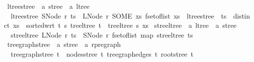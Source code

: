 \begin{isabellebody}
\isanewline
{}\isamarkupfalse%
\ ltree{\isacharunderscore}{\kern0pt}stree\ {\isacharcolon}{\kern0pt}{\isacharcolon}{\kern0pt}\ {\isachardoublequoteopen}{\isacharprime}{\kern0pt}a\ stree\ {\isasymRightarrow}\ {\isacharprime}{\kern0pt}a\ ltree{\isachardoublequoteclose}\ \isanewline
\ \ {\isachardoublequoteopen}ltree{\isacharunderscore}{\kern0pt}stree\ {\isacharparenleft}{\kern0pt}SNode\ r\ ts{\isacharparenright}{\kern0pt}\ {\isacharequal}{\kern0pt}\ LNode\ r\ {\isacharparenleft}{\kern0pt}SOME\ xs{\isachardot}{\kern0pt}\ fset{\isacharunderscore}{\kern0pt}of{\isacharunderscore}{\kern0pt}list\ xs\ {\isacharequal}{\kern0pt}\ ltree{\isacharunderscore}{\kern0pt}stree\ {\isacharbar}{\kern0pt}{\isacharbackquote}{\kern0pt}{\isacharbar}{\kern0pt}\ ts\ {\isasymand}\ distinct\ xs\ {\isasymand}\ sorted{\isacharunderscore}{\kern0pt}wrt\ {\isacharparenleft}{\kern0pt}{\isasymlambda}t\ s{\isachardot}{\kern0pt}\ tree{\isacharunderscore}{\kern0pt}ltree\ t\ {\isasymle}\ tree{\isacharunderscore}{\kern0pt}ltree\ s{\isacharparenright}{\kern0pt}\ xs{\isacharparenright}{\kern0pt}{\isachardoublequoteclose}\isanewline
\isanewline
{}\isamarkupfalse%
\ stree{\isacharunderscore}{\kern0pt}ltree\ {\isacharcolon}{\kern0pt}{\isacharcolon}{\kern0pt}\ {\isachardoublequoteopen}{\isacharprime}{\kern0pt}a\ ltree\ {\isasymRightarrow}\ {\isacharprime}{\kern0pt}a\ stree{\isachardoublequoteclose}\ \isanewline
\ \ {\isachardoublequoteopen}stree{\isacharunderscore}{\kern0pt}ltree\ {\isacharparenleft}{\kern0pt}LNode\ r\ ts{\isacharparenright}{\kern0pt}\ {\isacharequal}{\kern0pt}\ SNode\ r\ {\isacharparenleft}{\kern0pt}fset{\isacharunderscore}{\kern0pt}of{\isacharunderscore}{\kern0pt}list\ {\isacharparenleft}{\kern0pt}map\ stree{\isacharunderscore}{\kern0pt}ltree\ ts{\isacharparenright}{\kern0pt}{\isacharparenright}{\kern0pt}{\isachardoublequoteclose}\isanewline
\isanewline
{}\isamarkupfalse%
\ tree{\isacharunderscore}{\kern0pt}graph{\isacharunderscore}{\kern0pt}stree\ {\isacharcolon}{\kern0pt}{\isacharcolon}{\kern0pt}\ {\isachardoublequoteopen}{\isacharprime}{\kern0pt}a\ stree\ {\isasymRightarrow}\ {\isacharprime}{\kern0pt}a\ rpregraph{\isachardoublequoteclose}\ \isanewline
\ \ {\isachardoublequoteopen}tree{\isacharunderscore}{\kern0pt}graph{\isacharunderscore}{\kern0pt}stree\ t\ {\isacharequal}{\kern0pt}\ {\isacharparenleft}{\kern0pt}nodes{\isacharunderscore}{\kern0pt}stree\ t{\isacharcomma}{\kern0pt}\ tree{\isacharunderscore}{\kern0pt}graph{\isacharunderscore}{\kern0pt}edges\ t{\isacharcomma}{\kern0pt}\ root{\isacharunderscore}{\kern0pt}stree\ t{\isacharparenright}{\kern0pt}{\isachardoublequoteclose}\isanewline

\end{isabellebody}
